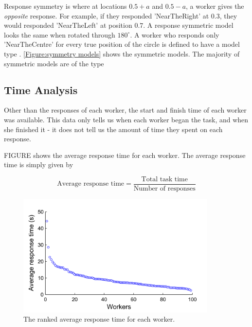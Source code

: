 Response symmetry is where at locations $0.5 + a$ and $0.5-a$, a worker gives the \textit{opposite} response. 
For example, if they responded 'NearTheRight' at $0.3$, they would responded 'NearTheLeft' at position $0.7$. 
A response symmetric model looks the same when rotated through $180^\circ$. 
A worker who responds only 'NearTheCentre' for every true position of the circle is defined to have a model type \trueSym. \ref{Figure:symmetry models} shows the symmetric models.
The majority of symmetric models are of the type \resSym



\subsection{Time Analysis}

Other than the responses of each worker, the start and finish time of each worker was available. 
This data only tells us when each worker began the task, and when she finished it - it does not tell us the amount of time they spent on each response.

FIGURE shows the average response time for each worker. 
The average response time is simply given by 

\[ 
\text{Average response time} = \frac{\text{Total task time}}{\text{Number of responses}}
\]

\begin{figure}
\centering
\includegraphics[width=10cm]{line_time_all_responses.png}
\caption{The ranked average response time for each worker.  }
\label{Figure: average_response_time}
\end{figure}



